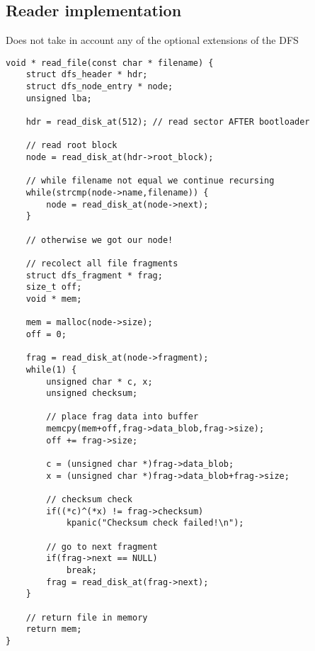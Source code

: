 \documentclass[12pt]{article}
\begin{document}
\subsection{Reader implementation}
Does not take in account any of the optional extensions of the DFS
\begin{verbatim}
void * read_file(const char * filename) {
	struct dfs_header * hdr;
	struct dfs_node_entry * node;
	unsigned lba;
	
	hdr = read_disk_at(512); // read sector AFTER bootloader
	
	// read root block
	node = read_disk_at(hdr->root_block);
	
	// while filename not equal we continue recursing
	while(strcmp(node->name,filename)) {
		node = read_disk_at(node->next);
	}
	
	// otherwise we got our node!
	
	// recolect all file fragments
	struct dfs_fragment * frag;
	size_t off;
	void * mem;
	
	mem = malloc(node->size);
	off = 0;
	
	frag = read_disk_at(node->fragment);
	while(1) {
		unsigned char * c, x;
		unsigned checksum;
		
		// place frag data into buffer
		memcpy(mem+off,frag->data_blob,frag->size);
		off += frag->size;
		
		c = (unsigned char *)frag->data_blob;
		x = (unsigned char *)frag->data_blob+frag->size;
		
		// checksum check
		if((*c)^(*x) != frag->checksum)
			kpanic("Checksum check failed!\n");
		
		// go to next fragment
		if(frag->next == NULL)
			break;
		frag = read_disk_at(frag->next);
	}
	
	// return file in memory
	return mem;
}
\end{verbatim}
\end{document}
